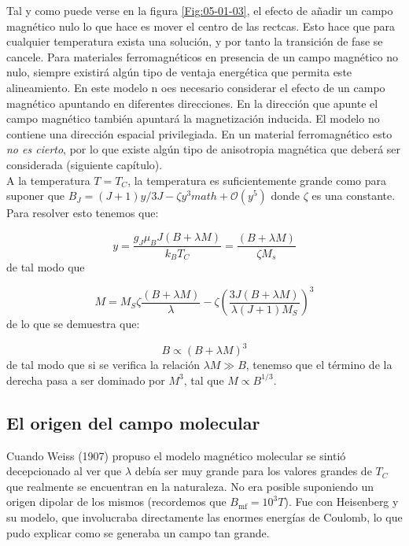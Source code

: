 \documentclass[12pt,a4paper]{book}
\numberwithin{equation}{section}
\numberwithin{figure}{section}
\newcommand{\parentesis}[1]{\left( #1  \right)}
\newcommand{\mf}{\mathrm{mf}}
\begin{document}
Tal y como puede verse en la figura \ref{Fig:05-01-03}, el efecto de añadir un campo magnético nulo lo que hace es mover el centro de las rectcas. Esto hace que para cualquier temperatura exista una solución, y por tanto la transición de fase se cancele. Para materiales ferromagnéticos en presencia de un campo magnético no nulo, siempre existirá algún tipo de ventaja energética que permita este alineamiento. En este modelo n oes necesario considerar el efecto de un campo magnético apuntando en diferentes direcciones. En la dirección  que apunte el campo magnético también apuntará la magnetización inducida. El modelo no contiene una dirección espacial privilegiada. En un material ferromagnético esto \textit{no es cierto}, por lo que existe algún tipo de anisotropia magnética que deberá ser considerada (siguiente capítulo).  \\

A la temperatura $T=T_C$, la temperatura es suficientemente grande como para suponer que $B_J=(J+1)y/3J -\zeta y^3math + \mathcal{O} (y^5)$ donde $\zeta$ es una constante. Para resolver esto tenemos que:

\begin{equation}
    y = \frac{g_J \mu_B J (B+\lambda M)}{k_B T_C} = \frac{(B+\lambda M)}{\zeta M_s}
\end{equation}
de tal modo que

\begin{equation}
    M = M_S \zeta \frac{(B+\lambda M)}{\lambda} - \zeta \parentesis{\frac{3J(B+\lambda M)}{\lambda (J+1) M_S}}^3
\end{equation}
de lo que se demuestra que:

\begin{equation}
    B \varpropto (B+\lambda M)^3
\end{equation}
de tal modo que si se verifica la relación $\lambda M \gg B$, tenemso que el término de la derecha pasa a ser dominado por $M^3$, tal que $M \varpropto B^{1/3}$.


\subsection{El origen del campo molecular}

Cuando Weiss (1907) propuso el modelo magnético molecular se sintió decepcionado al ver que $\lambda$ debía ser muy grande para los valores grandes de $T_C$ que realmente se encuentran en la naturaleza. No era posible suponiendo un origen dipolar de los mismos (recordemos que $B_\mf = 10^3T$). Fue con Heisenberg y su modelo, que involucraba directamente las enormes energías de Coulomb, lo que pudo explicar como se generaba un campo tan grande. \\
\end{document}
